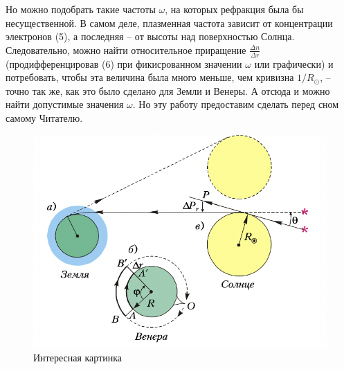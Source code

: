 \begin{multicols}{2}
        \par
        Но можно подобрать такие частоты $\omega$, на которых рефракция была бы несущественной. В самом деле, плазменная частота зависит от концентрации электронов (5), а последняя – от высоты над поверхностью Солнца. Следовательно, можно найти относительное приращение $\frac{\Delta n}{\Delta r}$ (продифференцировав (6) при фикисрованном значении $\omega$ или графически) и потребовать, чтобы эта величина была много меньше, чем кривизна $1/R_{\odot}$, – точно так же, как это было сделано для Земли и Венеры. А отсюда и можно найти допустимые значения $\omega$. Но эту работу предоставим сделать перед сном самому Читателю. 
        
        
    \end{multicols}
    \newpage
    \pagestyle{main2}
        \begin{figure}[h]

            \centering
            
            \includegraphics[width=0.8\linewidth]{1.png}
            
            \caption{Интересная картинка}
            
            \label{fig:mpr}
        
        \end{figure}